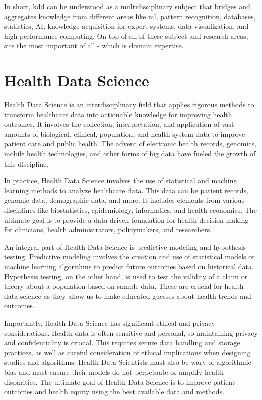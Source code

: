 In short, \ac{kdd} can be understood as a multidisciplinary subject that bridges and aggregates knowledge from different areas like \ac{ml}, pattern recognition, databases, statistics, AI, knowledge acquisition for expert systems, data visualization, and high-performance computing. On top of all of these subject and research areas, sits the most important of all - which is domain expertise.



\section{Health Data Science}
Health Data Science is an interdisciplinary field that applies rigorous methods to transform healthcare data into actionable knowledge for improving health outcomes. It involves the collection, interpretation, and application of vast amounts of biological, clinical, population, and health system data to improve patient care and public health. The advent of electronic health records, genomics, mobile health technologies, and other forms of big data have fueled the growth of this discipline.

In practice, Health Data Science involves the use of statistical and machine learning methods to analyze healthcare data. This data can be patient records, genomic data, demographic data, and more. It includes elements from various disciplines like biostatistics, epidemiology, informatics, and health economics. The ultimate goal is to provide a data-driven foundation for health decision-making for clinicians, health administrators, policymakers, and researchers.

An integral part of Health Data Science is predictive modeling and hypothesis testing. Predictive modeling involves the creation and use of statistical models or machine learning algorithms to predict future outcomes based on historical data. Hypothesis testing, on the other hand, is used to test the validity of a claim or theory about a population based on sample data. These are crucial for health data science as they allow us to make educated guesses about health trends and outcomes.

Importantly, Health Data Science has significant ethical and privacy considerations. Health data is often sensitive and personal, so maintaining privacy and confidentiality is crucial. This requires secure data handling and storage practices, as well as careful consideration of ethical implications when designing studies and algorithms. Health Data Scientists must also be wary of algorithmic bias and must ensure their models do not perpetuate or amplify health disparities. The ultimate goal of Health Data Science is to improve patient outcomes and health equity using the best available data and methods.


